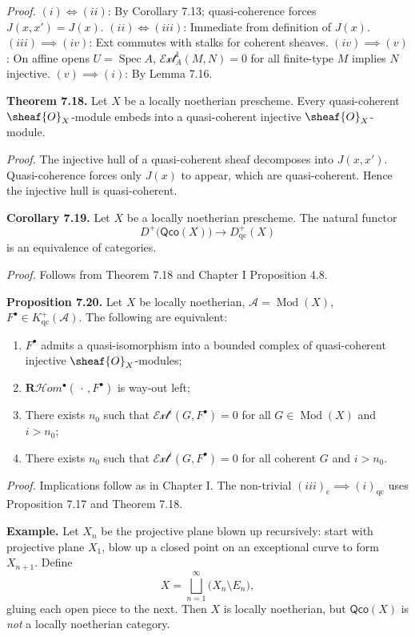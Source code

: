 \textit{Proof.}
$(i)\iff(ii)$: By Corollary 7.13; quasi-coherence forces $J(x,x')=J(x)$.
$(ii)\iff(iii)$: Immediate from definition of $J(x)$.
$(iii)\implies(iv)$: Ext commutes with stalks for coherent sheaves.
$(iv)\implies(v)$: On affine opens $U=\operatorname{Spec}A$, $\mathcal{Ext}_A^1(M,N)=0$ for all finite-type $M$ implies $N$ injective.
$(v)\implies(i)$: By Lemma 7.16.

\setcounter{page}{133}
\textbf{Theorem 7.18.}
Let $X$ be a locally noetherian prescheme. Every quasi-coherent $\sheaf{O}_X$-module embeds into a quasi-coherent injective $\sheaf{O}_X$-module.

\textit{Proof.}
The injective hull of a quasi-coherent sheaf decomposes into $J(x,x')$. Quasi-coherence forces only $J(x)$ to appear, which are quasi-coherent. Hence the injective hull is quasi-coherent.

\setcounter{page}{134}
\textbf{Corollary 7.19.}
Let $X$ be a locally noetherian prescheme. The natural functor
\[
D^+\big(\mathsf{Qco}(X)\big) \to D_{\mathrm{qc}}^+(X)
\]
is an equivalence of categories.

\textit{Proof.}
Follows from Theorem 7.18 and Chapter I Proposition 4.8.

\textbf{Proposition 7.20.}
Let $X$ be locally noetherian, $\mathcal{A}=\operatorname{Mod}(X)$, $F^\bullet\in K_{\mathrm{qc}}^+(\mathcal{A})$. The following are equivalent:
\begin{enumerate}
\item[(i)$_{\mathrm{qc}}$] $F^\bullet$ admits a quasi-isomorphism into a bounded complex of quasi-coherent injective $\sheaf{O}_X$-modules;
\item[(ii)] $\mathbf{R}\mathcal{H}\textit{om}^\bullet(\,\cdot\,,F^\bullet)$ is way-out left;
\item[(iii)] There exists $n_0$ such that $\mathcal{Ext}^i(G,F^\bullet)=0$ for all $G\in\operatorname{Mod}(X)$ and $i>n_0$;
\item[(iii)$_{\mathrm{c}}$] There exists $n_0$ such that $\mathcal{Ext}^i(G,F^\bullet)=0$ for all coherent $G$ and $i>n_0$.
\end{enumerate}

\textit{Proof.}
Implications follow as in Chapter I. The non-trivial $(iii)_{\mathrm{c}}\implies(i)_{\mathrm{qc}}$ uses Proposition 7.17 and Theorem 7.18.

\setcounter{page}{135}
\textbf{Example.}
Let $X_n$ be the projective plane blown up recursively: start with projective plane $X_1$, blow up a closed point on an exceptional curve to form $X_{n+1}$. Define
\[
X = \bigsqcup_{n=1}^\infty \big(X_n\setminus E_n\big),
\]
gluing each open piece to the next. Then $X$ is locally noetherian, but $\mathsf{Qco}(X)$ is \textit{not} a locally noetherian category.

